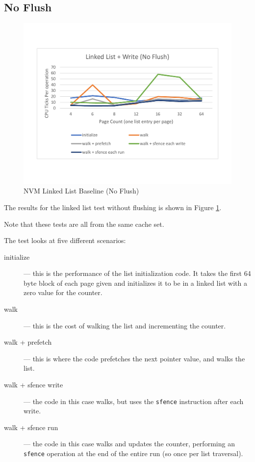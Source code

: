 \subsection{No Flush}\label{ll:sec:noflush}

\begin{figure}
    \centering
    \caption{NVM Linked List Baseline (No Flush)}\label{micro:llbaseline:noflush}
    \includegraphics[scale=0.35]{micro/nvm-linked-list-baseline-no-flush.pdf}
\end{figure}

The results for the linked list test without flushing is
shown in Figure \ref{micro:llbaseline:noflush}.

Note that these tests are all from the same cache set.

The test looks at five different scenarios:

\begin{description}
    \item[initialize] --- this is the performance of the list initialization code.  It takes the first 64 byte block of each page given and initializes it to be in a linked list with a zero value for the counter.
    \item[walk] --- this is the cost of walking the list and incrementing the counter.
    \item[walk + prefetch] --- this is where the code prefetches the next pointer value, and walks the list.
    \item[walk + sfence write] --- the code in this case walks, but uses the \texttt{sfence} instruction after each write.
    \item[walk + sfence run] --- the code in this case walks and updates the counter, performing an \texttt{sfence} operation at the end of the entire run (so once per list traversal).
\end{description}

